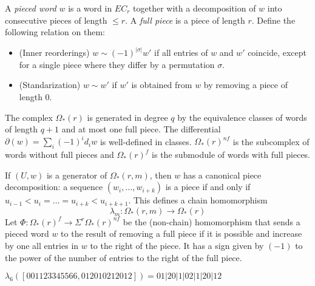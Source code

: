 A \emph{pieced word} $w$ is a word in $EC_r$ together with a decomposition of $w$ into consecutive pieces of length $\leq r$. A \emph{full piece} is a piece of length $r$. Define the following relation on them:
\begin{itemize}
	\item (Inner reorderings) $w\sim (-1)^{|\sigma|}w'$ if all entries of $w$ and $w'$ coincide, except for a single piece where they differ by a permutation $\sigma$.
	\item (Standarization) $w\sim w'$ if $w'$ is obtained from $w$ by removing a piece of length $0$.
\end{itemize}
The complex $\Omega_*(r)$ is generated in degree $q$ by the equivalence classes of words of length $q+1$ and at most one full piece.
The differential $\partial(w) = \sum_{i} (-1)^id_iw$ is well-defined in classes. $\Omega_*(r)^{nf}$ is the subcomplex of words without full pieces and $\Omega_*(r)^{f}$ is the submodule of words with full pieces.

If $(U,w)$ is a generator of $\Omega_*(r,m)$, then $w$ has a canonical piece decomposition: a sequence $(w_i,\ldots,w_{i+k})$ is a piece if and only if $u_{i-1}<u_i =\ldots= u_{i+k}<u_{i+k+1}$. This defines a chain homomorphism
\[\lambda_m\colon \Omega_*(r,m)\to \Omega_*(r)\]
Let $\Phi\colon \Omega_*(r)^f\to \Sigma^{r}\Omega_{*}(r)^{nf}$ be the (non-chain) homomorphism that sends a pieced word $w$ to the result of removing a full piece if it is possible and increase by one all entries in $w$ to the right of the piece. It has a sign given by $(-1)$ to the power of the number of entries to the right of the full piece. 
\begin{example}\label{ex:106}
    $\lambda_6([001123345566,012010212012]) = 01|20|1|02|1|20|12$
\end{example}



